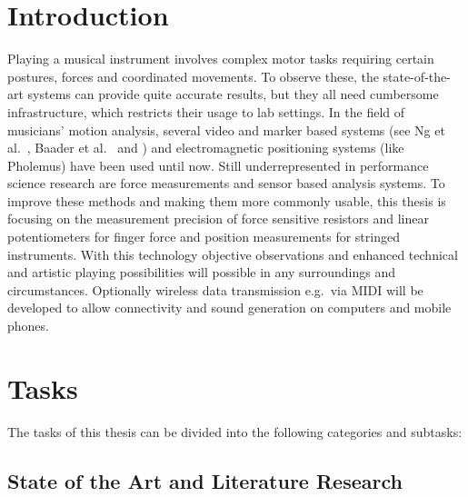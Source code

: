 
\section*{Introduction}
Playing a musical instrument involves complex motor tasks requiring certain postures, forces and coordinated movements. 
To observe these, the state-of-the-art systems can provide quite accurate results, but they all need cumbersome infrastructure, which restricts their usage to lab settings.
In the field of musicians' motion analysis, several video and marker based systems (see Ng et al.~\cite{Ng3MD2009}, Baader et al.~\cite{BaaderKazennikov2005-CoB} and \cite{GoeblPalmerTFA2008}) and electromagnetic positioning systems (like Pholemus) have been used until now. 
Still underrepresented in performance science research are force measurements and sensor based analysis systems. 
To improve these methods and making them more commonly usable, this thesis is focusing on the measurement precision of force sensitive resistors and linear potentiometers for finger force and position measurements for stringed instruments. 
With this technology objective observations and enhanced technical and artistic playing possibilities will possible in any surroundings and circumstances. %
Optionally wireless data transmission e.g.~via MIDI will be developed to allow connectivity and sound generation on computers and mobile phones. 
\section*{Tasks}

The tasks of this thesis can be divided into the following categories and subtasks:

\subsection* {State of the Art and Literature Research}

